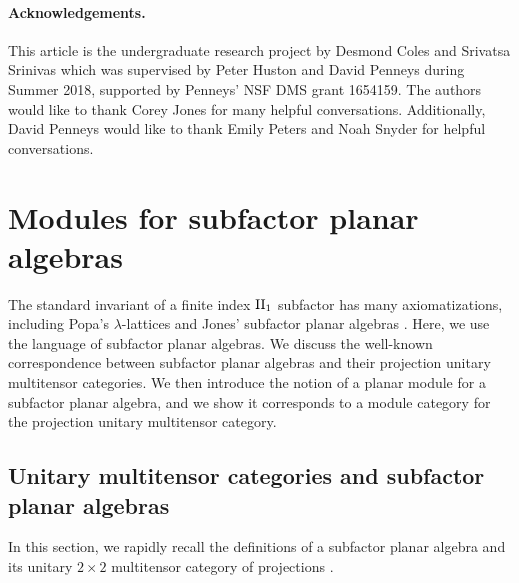 \documentclass[11pt]{article}
\theoremstyle{plain}
\theoremstyle{definition}
\begin{document}
\paragraph{Acknowledgements.}

This article is the undergraduate research project by Desmond Coles and Srivatsa Srinivas which was supervised by Peter Huston and David Penneys during Summer 2018, supported by Penneys' NSF DMS grant 1654159.
The authors would like to thank Corey Jones for many helpful conversations.
Additionally, David Penneys would like to thank Emily Peters and Noah Snyder for helpful conversations.


\section{Modules for subfactor planar algebras} 
\label{sec:Modules}

The standard invariant of a finite index ${\rm II}_1$ subfactor has many axiomatizations, including Popa's $\lambda$-lattices \cite{MR1334479} and Jones' subfactor planar algebras \cite{math.QA/9909027}.
Here, we use the language of subfactor planar algebras.
We discuss the well-known correspondence between subfactor planar algebras and their projection unitary multitensor categories.
We then introduce the notion of a planar module for a subfactor planar algebra, and we show it corresponds to a module category for the projection unitary multitensor category.

\subsection{Unitary multitensor categories and subfactor planar algebras}  
\label{sec:CategoriesPlanarAlgberasLattices}

In this section, we rapidly recall the definitions of a subfactor planar algebra \cite{math.QA/9909027} and its unitary $2\times 2$ multitensor category of projections \cite{MR2811311,1808.00323}.
\end{document}
